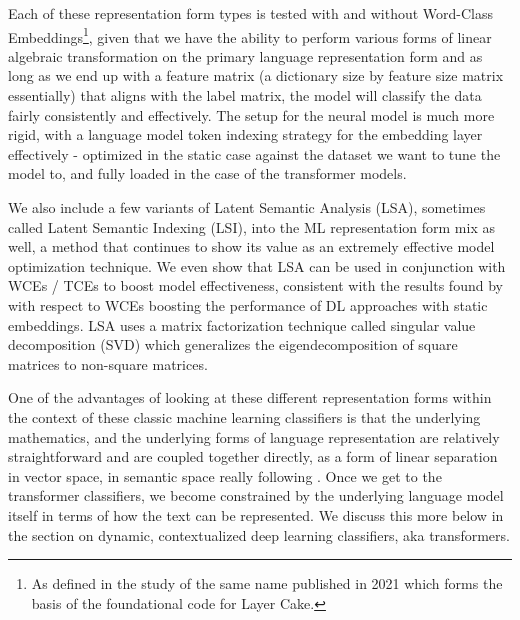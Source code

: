 \documentclass[final]{clv2025-revised}
\begin{document}
Each of these representation form types is tested with and without Word-Class Embeddings\footnote{As defined in the study of the same name published in 2021 \cite{moreo2021} which forms the basis of the foundational code for Layer Cake.}, given that we have the ability to perform various forms of linear algebraic transformation on the primary language representation form and as long as we end up with a feature matrix  (a  dictionary size by feature size matrix essentially) that aligns with the label matrix, the model will classify the data fairly consistently and effectively. The setup for the neural model is much more rigid, with a language model token indexing strategy for the embedding layer effectively - optimized in the static case against the dataset we want to tune the model to, and fully loaded in the case of the transformer models.   

We also include a few variants of Latent Semantic Analysis (LSA), sometimes called Latent Semantic Indexing (LSI), \cite{deerwester} into the ML representation form mix as well, a method that continues to show its value as an extremely effective model optimization technique. We even show that LSA can be used in conjunction with WCEs / TCEs to boost model effectiveness, consistent with the results found by \cite{moreo2021} with respect to WCEs boosting the performance of DL approaches with static embeddings. LSA uses a matrix factorization technique called singular value decomposition (SVD) which generalizes the eigendecomposition of square matrices to non-square matrices. 

One of the advantages of looking at these different representation forms within the context of these classic machine learning classifiers is that the underlying mathematics, and the underlying forms of language representation are relatively straightforward and are coupled together directly, as a form of linear separation in vector space, in semantic space really following \cite{worth}. Once we get to the transformer classifiers, we become constrained by the underlying language model itself in terms of how the text can be represented. We discuss this more below in the section on dynamic, contextualized deep learning classifiers, aka transformers.
\end{document}
